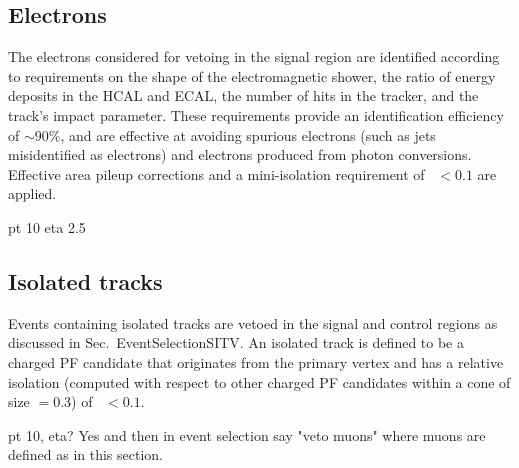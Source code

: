 \subsection*{Electrons}


The electrons considered for vetoing in the signal region are identified 
according to requirements on the shape of the electromagnetic shower, the ratio 
of energy deposits in the HCAL and ECAL, the number of hits in the tracker, and 
the track's impact parameter.  %
These requirements provide an identification efficiency of $\sim90$\%, and are 
effective at %
avoiding spurious electrons (such as jets misidentified as 
electrons) and electrons produced from photon conversions. %
Effective area pileup corrections and a mini-isolation requirement of 
\miniiso~$ < 0.1$ are applied.

pt 10 eta 2.5

\subsection*{Isolated tracks}

Events containing isolated tracks are vetoed in the signal and control regions 
as discussed in Sec.~EventSelectionSITV. An isolated track is defined to be a 
charged PF candidate that originates from the primary vertex and has a relative 
isolation (computed with respect to other charged PF candidates within a cone 
of size \DR$=0.3$) of \reliso~$ < 0.1$.

pt 10, eta?
Yes and then in event selection say "veto muons" where muons are defined as in 
this section.

